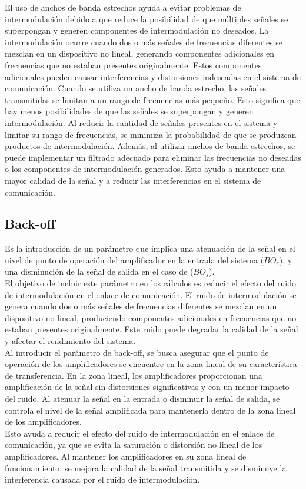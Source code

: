 \documentclass[
	12pt, %
	fleqn, %
	a4paper, %
	oneside, %
]{LegrandOrangeBook}
\begin{document}
\begin{notation}
El uso de anchos de banda estrechos ayuda a evitar problemas de intermodulación debido a que reduce la posibilidad de que múltiples señales se superpongan y generen componentes de intermodulación no deseados. La intermodulación ocurre cuando dos o más señales de frecuencias diferentes se mezclan en un dispositivo no lineal, generando componentes adicionales en frecuencias que no estaban presentes originalmente. Estos componentes adicionales pueden causar interferencias y distorsiones indeseadas en el sistema de comunicación. Cuando se utiliza un ancho de banda estrecho, las señales transmitidas se limitan a un rango de frecuencias más pequeño. Esto significa que hay menos posibilidades de que las señales se superpongan y generen intermodulación. Al reducir la cantidad de señales presentes en el sistema y limitar su rango de frecuencias, se minimiza la probabilidad de que se produzcan productos de intermodulación. Además, al utilizar anchos de banda estrechos, se puede implementar un filtrado adecuado para eliminar las frecuencias no deseadas o los componentes de intermodulación generados. Esto ayuda a mantener una mayor calidad de la señal y a reducir las interferencias en el sistema de comunicación.
\end{notation}
\subsection{Back-off}
Es la introducción de un parámetro que implica una atenuación de la señal en el nivel de punto de operación del amplificador en la entrada del sistema ($BO_e$), y una disminución de la señal de salida en el caso de ($BO_s$).\\
El objetivo de incluir este parámetro en los cálculos es reducir el efecto del ruido de intermodulación en el enlace de comunicación. El ruido de intermodulación se genera cuando dos o más señales de frecuencias diferentes se mezclan en un dispositivo no lineal, produciendo componentes adicionales en frecuencias que no estaban presentes originalmente. Este ruido puede degradar la calidad de la señal y afectar el rendimiento del sistema.\\
Al introducir el parámetro de back-off, se busca asegurar que el punto de operación de los amplificadores se encuentre en la zona lineal de su característica de transferencia. En la zona lineal, los amplificadores proporcionan una amplificación de la señal sin distorsiones significativas y con un menor impacto del ruido. Al atenuar la señal en la entrada o disminuir la señal de salida, se controla el nivel de la señal amplificada para mantenerla dentro de la zona lineal de los amplificadores.\\
Esto ayuda a reducir el efecto del ruido de intermodulación en el enlace de comunicación, ya que se evita la saturación o distorsión no lineal de los amplificadores. Al mantener los amplificadores en su zona lineal de funcionamiento, se mejora la calidad de la señal transmitida y se disminuye la interferencia causada por el ruido de intermodulación.
\end{document}

